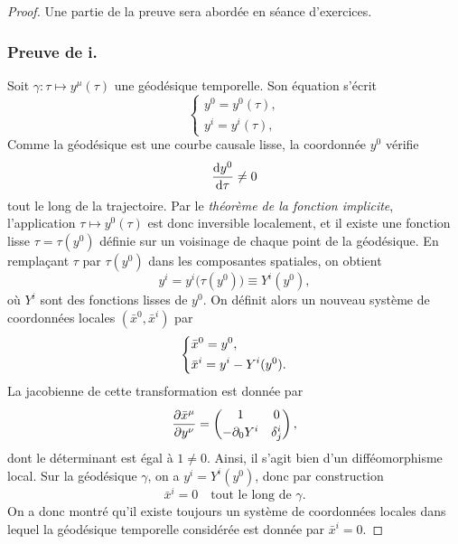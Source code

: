 \begin{proof}
    Une partie de la preuve sera abordée en séance d'exercices.
    \subsubsection{Preuve de i.}
    Soit $\gamma : \tau \mapsto y^\mu(\tau)$ une géodésique temporelle. 
    Son équation s'écrit
    \begin{equation}
        \begin{cases}
            y^0 = y^0(\tau),\\
            y^i = y^i(\tau),
        \end{cases}
    \end{equation}
    Comme la géodésique est une courbe causale lisse, la coordonnée $y^0$ vérifie
    \begin{align}
        \frac{\mathrm{d} y^0}{\mathrm{d}\tau} \neq 0
    \end{align}
    tout le long de la trajectoire. Par le \emph{théorème de la fonction implicite}, 
    l'application $\tau \mapsto y^0(\tau)$ est donc inversible localement, et il existe une fonction lisse 
    $\tau = \tau(y^0)$ définie sur un voisinage de chaque point de la géodésique. En remplaçant $\tau$ par $\tau(y^0)$ dans les composantes spatiales, on obtient
    \begin{equation}
        y^i = y^i\big(\tau(y^0)\big) \equiv Y^i(y^0),
    \end{equation}
    où $Y^i$ sont des fonctions lisses de $y^0$. On définit alors un nouveau système de coordonnées locales $(\bar x^0, \bar x^i)$ par
    \begin{equation}
        \begin{dcases}
            \bar x^0 = y^0,\\
            \bar x^i = y^i - Y^i(y^0).
        \end{dcases}
    \end{equation}
    La jacobienne de cette transformation est donnée par
    \begin{equation}
        \frac{\partial \bar x^\mu}{\partial y^\nu} =
        \begin{pmatrix}
            1 & 0\\[2pt]
            -\partial_{0} Y^i & \delta^i_j
        \end{pmatrix},
    \end{equation}
    dont le déterminant est égal à $1\neq 0$. Ainsi, il s'agit bien d'un difféomorphisme local. Sur la géodésique $\gamma$, on a $y^i = Y^i(y^0)$, donc par construction
    \begin{equation}
        \bar x^i = 0 \quad \text{tout le long de $\gamma$}.
    \end{equation}
    On a donc montré qu'il existe toujours un système de coordonnées locales dans lequel la géodésique temporelle considérée est donnée par $\bar x^i=0$.
    

\end{proof}
